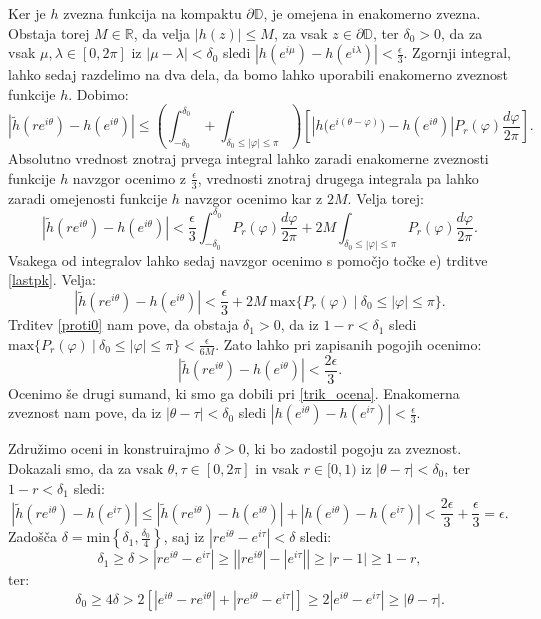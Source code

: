 \documentclass[mat1]{fmfdelo}
\begin{document}
\begin{dokaz}
        Ker je $h$ zvezna funkcija na kompaktu $\partial \mathbb{D}$, je omejena in enakomerno zvezna.  
        Obstaja torej $M \in \mathbb{R}$, da velja $|h(z)| \leq M$, za vsak $z \in \partial \mathbb{D}$, ter $\delta_0 >0$, da za vsak $\mu, \lambda \in [0,2\pi]$ iz $|\mu - \lambda| < \delta_0$ sledi $|h(e^{i \mu}) - h(e^{i \lambda})| < \frac{\epsilon}{3}$.
        Zgornji integral, lahko sedaj razdelimo na dva dela, da bomo lahko uporabili enakomerno zveznost funkcije $h$. Dobimo:
        $$
        \left|\widetilde{h}(re^{i\theta}) - h(e^{i\theta})\right| \leq \left(\int_{-\delta_0}^{\delta_0} + \int_{\delta_0 \leq |\varphi| \le \pi}\right){\left[\left| h\big(e^{i(\theta - \varphi)}\big) - h(e^{i\theta})\right|P_r(\varphi)\frac{d\varphi}{2\pi}\right]}.
        $$
        Absolutno vrednost znotraj prvega integral lahko zaradi enakomerne zveznosti funkcije $h$ navzgor ocenimo z $\frac{\epsilon}{3}$, vrednosti znotraj drugega integrala pa lahko zaradi omejenosti funkcije $h$ navzgor ocenimo kar z $2M$. Velja torej:
        $$
        \left|\widetilde{h}(re^{i\theta}) - h(e^{i\theta})\right| < \frac{\epsilon}{3} \int_{-\delta_0}^{\delta_0}{P_r(\varphi) \frac{d\varphi}{2\pi}} + 2M\int_{\delta_0 \leq |\varphi| \leq \pi}{P_r(\varphi)\frac{d\varphi}{2\pi}}.
        $$
        Vsakega od integralov lahko sedaj navzgor ocenimo s pomočjo točke e) trditve \ref{lastpk}. Velja:
        $$
        \left|\widetilde{h}(re^{i\theta}) - h(e^{i\theta})\right| < \frac{\epsilon}{3}  + 2M~\text{max}\{P_r(\varphi)~| ~\delta_0 \leq |\varphi| \leq \pi \}.
        $$
        Trditev \ref{proti0} nam pove, da obstaja $\delta_1 >0$, da iz $1 - r < \delta_1$ sledi $\text{max}\{P_r(\varphi)~| ~\delta_0 \leq |\varphi| \leq \pi \} < \frac{\epsilon}{6M}$.
        Zato lahko pri zapisanih pogojih ocenimo:
        $$
        \left|\widetilde{h}(re^{i\theta}) - h(e^{i\theta})\right| < \frac{2 \epsilon}{3}.
        $$
        Ocenimo še drugi sumand, ki smo ga dobili pri \eqref{trik_ocena}. Enakomerna zveznost nam pove, da iz $|\theta - \tau| < \delta_0$ sledi $|h\left(e^{i\theta}\right) - h\left(e^{i\tau}\right)| < \frac{\epsilon}{3}$.
        
        Združimo oceni in konstruirajmo $\delta>0$, ki bo zadostil pogoju za zveznost. Dokazali smo, da za vsak $\theta, \tau \in [0,2\pi]$ in vsak $r \in [0,1)$ iz $|\theta - \tau| < \delta_0$, ter $1- r < \delta_1$ sledi:
        $$
        \left|\widetilde{h}(r e^{i \theta}) - h(e^{i\tau})\right| \leq \left|\widetilde{h}(re^{i\theta}) - h(e^{i\theta})\right| + \left|h\left(e^{i\theta}\right) - h\left(e^{i\tau}\right)\right| < \frac{2 \epsilon}{3} + \frac{\epsilon}{3} = \epsilon.
        $$
        Zadošča $\delta = \text{min}\left\{\delta_1, \frac{\delta_0}{4}\right\}$, saj iz $|r e^{i \theta} - e^{i\tau}| < \delta$ sledi: 
        $$ 
            \delta_1 \geq \delta > |r e^{i \theta} - e^{i\tau}| \geq \left||r e^{i \theta}| - |e^{i\tau}|\right| \geq |r - 1| \geq 1 -r, 
        $$
        ter:
        $$ 
            \delta_0 \geq 4 \delta > 2 \left[\left| e^{i \theta} - r e^{i\theta} \right| +  \left|r e^{i\theta} - e^{i\tau} \right| \right] \geq 2 \left|e^{i\theta} - e^{i\tau} \right| \geq |\theta - \tau|.
        $$
    \end{dokaz}
\end{document}
